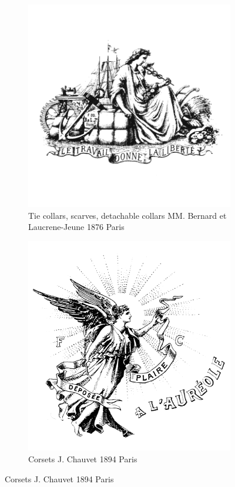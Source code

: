 \begin{figure}[h]
  \centering
  \begin{subfigure}{.45\textwidth}
    \centering
    \includegraphics[width=.5\linewidth]{images/supplement/trademarks/french/3_5}
    \caption{Tie collars, scarves, detachable collars MM. Bernard et Laucrene-Jeune 1876 Paris}
    \label{fig:trademarks:french:3.5}
  \end{subfigure}\hfill
  \begin{subfigure}{.45\textwidth}
    \centering
    \includegraphics[width=.5\linewidth]{images/supplement/trademarks/french/3_8}
    \caption{Corsets J. Chauvet 1894 Paris}
    \label{fig:trademarks:french:3.8}
  \end{subfigure}


\end{figure}
